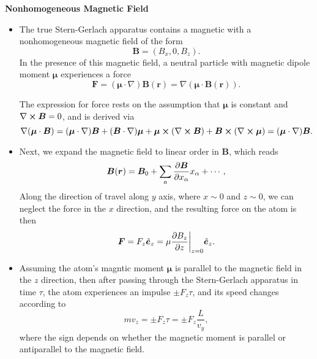 \documentclass[11pt, a4paper]{article}
\renewcommand{\curl}{\nabla \cross}
\renewcommand{\grad}{\nabla}
\newcommand{\SG}{Stern-Gerlach\xspace}
\renewcommand{\vec}[1]{\bm{#1}}  %
\newcommand{\uvec}[1]{\hat{\vec{#1}}}  %
\renewcommand{\r}{\vec{r}}  %
\newcommand{\B}{\vec{B}}  %
\newcommand{\m}{\vec{\mu}}  %
\begin{document}
\textbf{Nonhomogeneous Magnetic Field}
\begin{itemize}
    \item The true \SG apparatus contains a magnetic with a nonhomogeneous magnetic field of the form
    \begin{equation*}
        \B = (B_{x}, 0, B_{z}).
    \end{equation*}
    In the presence of this magnetic field, a neutral particle with magnetic dipole moment $ \m $ experiences a force
    \begin{equation*}
        \vec{F} = (\vec{\mu} \cdot \grad)\B(\r) = \grad (\m \cdot \B(\r)).
    \end{equation*}
   

    The expression for force rests on the assumption that $ \m $ is constant and $ \curl \B = 0 $, and is derived via
    \begin{equation*}
        \grad (\m \cdot \B) = (\m \cdot \grad)\B + (\B \cdot \grad)\m + \m \cross (\curl \B) + \B \cross (\curl \m) = (\m \cdot \grad)\B.
    \end{equation*}
    
    \item Next, we expand the magnetic field to linear order in $ \B $, which reads
    \begin{equation*}
        \B(\r) = \B_{0} + \sum_{a} \pdv{\B}{x_{\alpha}}x_{\alpha} + \cdots,
    \end{equation*}
    Along the direction of travel along $ y $ axis, where $ x \sim 0 $ and $ z \sim 0 $, we can neglect the force in the $ x $ direction, and the resulting force on the atom is then
    \begin{equation*}
        \vec{F} = F_{z}\uvec{e}_{z} = \mu \pdv{B_{z}}{z}\bigg |_{z=0} \uvec{e}_{z}.
    \end{equation*}
    
    \item Assuming the atom's magntic moment $ \m $ is parallel to the magnetic field in the $ z $ direction, then after passing through the \SG apparatus in time $ \tau $, the atom experiences an impulse $ \pm F_{z} \tau $, and its speed changes according to
    \begin{equation*}
        m v_{z} = \pm F_{z} \tau = \pm F_{z} \frac{L}{v_{y}},
    \end{equation*}
    where the sign depends on whether the magnetic moment is parallel or antiparallel to the magnetic field.


\end{itemize}
\end{document}
